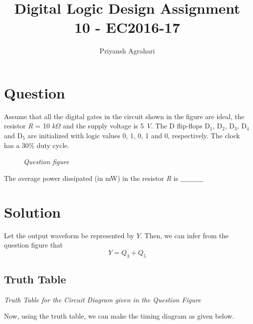 \documentclass[table,xcdraw]{article}
\title{Digital Logic Design Assignment 10 - EC2016-17}
\author{Priyansh Agrahari}
\begin{document}
\maketitle

\section{Question}
Assume that all the digital gates in the circuit shown in the figure are ideal, the resistor \textit{R} = 10 \textit{k}$\Omega$ and the supply voltage is 5 \textit{V}. The D flip-flops D$_1$, D$_2$, D$_3$, D$_4$ and D$_5$ are initialized with logic values 0, 1, 0, 1 and 0, respectively. The clock has a 30\% duty cycle.

\begin{figure}[h]
    \centering
    \scalebox{0.65}{
     }
    \caption{\textit{Question figure}}
    \label{fig:ques}
\end{figure}

The average power dissipated (in mW) in the resistor \textit{R} is $\_\_\_\_\_\_\_\_\_\_$
\vfill

\section{Solution}
Let the output waveform be represented by $Y$. Then, we can infer from the question figure that
\begin{equation}
    Y=Q_3+Q_5
\end{equation}

\subsection{Truth Table}
\begin{table}[H]
    \centering
    
    \caption{\textit{Truth Table for the Circuit Diagram given in the Question Figure}}
    \label{tab:table}
\end{table}
Now, using the truth table, we can make the timing diagram as given below.
\end{document}
